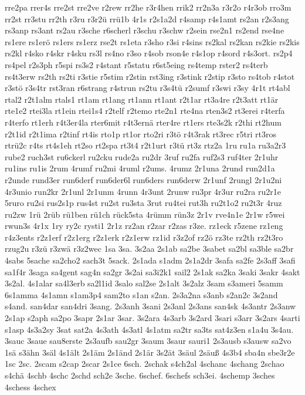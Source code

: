 {rre2pa
rrer4s
rre2st
rre2ve
r2rew
rr2he
r3r4hen
rrik2
rr2n3a
r3r2o
r4r3ob
rro3m
rr2st
rr3stu
rr2th
r3ru
r3r2ü
rrü1b
4r1s
r2s1a2d
r4samp
r4s1amt
rs2an
r2s3ang
rs3anp
rs3ant
rs2au
r3sche
r6scherl
r3schu
r3schw
r2sein
rse2n1
rs2end
rse4ne
rs1ere
rs1erö
rs1ers
rs1erz
rse2t
rs1eta
r3sho
r3si
r4sins
rs2kal
rs2kan
rs2kie
rs2kis
rs2kl
r4sko
r4skr
r4sku
rs3l
rs4no
r3so
r4sob
rson4e
r4s1op
r4sord
r4s3ort.
rs2p4
rs4pel
r2s3ph
r5spi
rs3s2
r4stant
r5statu
r6st5eing
rs4temp
rster2
rs4terb
rs4t3erw
rs2th
rs2ti
r3stie
r5stim
r2stin
rst3ing
r3stink
r2stip
r3sto
rs4tob
r4stot
r3stö
r3s4tr
rst3ran
r6strang
r4strun
rs2tu
r3s4tü
r2sumf
r3swi
r3sy
4r1t
rt4abl
rtal2
r2t1alm
rtals1
rt1am
rt1ang
rt1ann
rt1ant
r2t1ar
rt3a4re
r2t3att
rt1är
rte1e2
rtei3la
rt1ein
rtei1s4
r2telf
r2temo
rte2n1
rte4na
rten3s2
rt3erei
r4terfa
r4terfo
rt1erh
r4t3er4la
rter6mit
r4t3ernä
rter4re
rt1ers
rte3s2k
r2thi
rt2hum
r2t1id
r2t1ima
r2tinf
rt4is
rto1p
rt1or
rto2ri
r3tö
r4t3rak
rt3rec
r5tri
rt3ros
rtrü2c
r4ts
rt4s1eh
rt2so
rt2spa
rt3t4
r2t1urt
r3tü
rt3z
rtz2a
1ru
ru1a
ru3a2r3
rube2
ruch3st
ru6ckerl
ru2cku
rude2a
ru2dr
3ruf
ru2fa
ruf2s3
ruf4ter
2r1uhr
ru1ins
ru1is
2rum
4rumf
ru2mi
4ruml
r2ums.
4rumz
2r1una
2rund
run2d1a
r2unde
rund3er
run6derf
run6der6l
run6ders
run6derw
2r1unf
2rungl
2r1u2ni
4r3unio
run2kr
2r1unl
2r1unm
4runn
4r3unt
2runw
ru3pr
4r3ur
ru2ra
ru2r1e
5ruro
ru2si
rus2s1p
rus4st
ru2st
ru3sta
3rut
ru4tei
rut3h
ru2t1o2
ru2t3r
4ruz
ru2zw
1rü
2rüb
rü1ben
rü1ch
rück5sta
4rümm
rün3z
2r1v
rve4n1e
2r1w
r5wei
rwun3s
4r1x
1ry
ry2c
rysti1
2r1z
rz2an
r2zar
r2zas
r3ze.
rz1eck
r5zene
rz1eng
r4z3ents
r2z1erf
r2z1erg
r2z1erk
r2z1erw
rz1id
r3z2of
rz2ö
rz3te
rz2th
rz2t3ro
rzug2u
r3zü
r3zwä
r3z2wec
1sa
3sa.
3s2aa
2s1ab
sa2be
3sabet
sa2bl
sa3ble
sa2br
4sabs
5sache
sa2cho2
sach3t
5sack.
2s1ada
s1adm
2s1a2dr
3safa
sa2fe
2s3aff
3safi
sa1f4r
3saga
sa4gent
sag4n
sa2gr
3s2ai
sa3i2k1
sail2
2s1ak
sa2ka
3saki
3sakr
4sakt
3s2al.
4s1alar
sa4l3erb
sa2l1id
3salo
sal2se
2s1alt
3s2alz
3sam
s3ameri
5samm
6s1amma
4s1amn
s1am3p4
sam2to
s1an
s2an.
2s3a2na
s3anb
s2an2c
3s2and
s4and.
san4dar
san4dri
3sang.
2s3anh
3sani
2s3anl
2s3ans
san4sk
4s3antr
2s3anw
2s1ap
s2aph
sa2po
3sapr
2s1ar
3sar.
3s2ara
4s3arb
3s2ard
3sari
s3arr
3s2ars
4sarti
s1asp
4s3a2sy
3sat
sat2a
4s3ath
4s3atl
4s1atm
sa2tr
sa3ts
sat4z3en
s1a4u
3s4au.
3sauc
3saue
sau8erste
2s3aufb
sau2gr
3saum
3saur
sauri1
2s3ausb
s3ausw
sa2vo
1sä
s3ähn
3säl
4s1ält
2s1äm
2s1änd
2s1är
3s2ät
3säul
2säuß
4s3b4
sba4n
sbe3r2e
1sc
2sc.
2scam
s2cap
2scar
2s1ce
6sch.
2schak
s4ch2al
4schanc
4schang
2schao
s4chä
4schb
4schc
2schd
sch2e
3sche.
6schef.
6schefs
sch3ei.
4schemp
3sches
4schess
4schex
}
